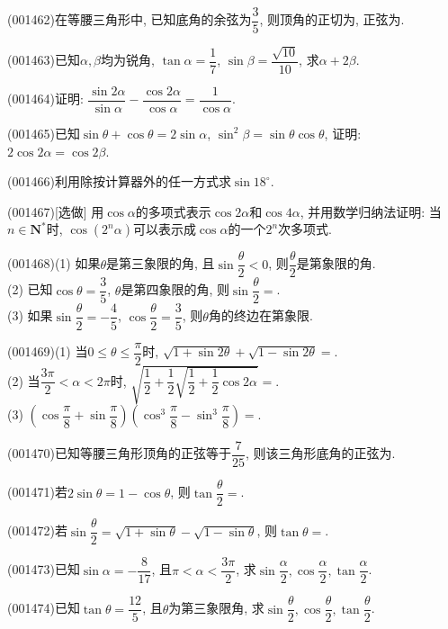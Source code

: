 \item (001462)在等腰三角形中, 已知底角的余弦为$\dfrac{3}{5}$, 则顶角的正切为, 正弦为.
\item (001463)已知$\alpha,\beta$均为锐角, $\tan\alpha=\dfrac{1}{7}$, $\sin\beta=\dfrac{\sqrt{10}}{10}$, 求$\alpha+2\beta$.
\item (001464)证明: $\dfrac{\sin 2\alpha}{\sin \alpha}-\dfrac{\cos 2\alpha}{\cos \alpha}=\dfrac{1}{\cos \alpha}$.
\item (001465)已知$\sin \theta+\cos\theta=2\sin \alpha$, $\sin^2\beta=\sin \theta\cos\theta$, 证明: $2\cos 2\alpha=\cos 2\beta$.
\item (001466)利用除按计算器外的任一方式求$\sin 18^\circ$.
\item (001467)[选做]
用$\cos\alpha$的多项式表示$\cos 2\alpha$和$\cos 4\alpha$, 并用数学归纳法证明: 当$n \in \mathbf{N}^*$时, $\cos(2^n \alpha)$可以表示成$\cos \alpha$的一个$2^n$次多项式.
\item (001468)(1) 如果$\theta$是第三象限的角, 且$\sin \dfrac{\theta}{2}<0$, 则$\dfrac{\theta}{2}$是第象限的角.\\ 
(2) 已知$\cos\theta=\dfrac{3}{5}$, $\theta$是第四象限的角, 则$\sin \dfrac{\theta}{2}=$.\\ 
(3) 如果$\sin \dfrac{\theta}{2}=-\dfrac{4}{5}$, $\cos\dfrac{\theta}{2}=\dfrac{3}{5}$, 则$\theta$角的终边在第象限.
\item (001469)(1) 当$0\le \theta\le \dfrac{\pi}{2}$时, $\sqrt{1+\sin 2\theta}+\sqrt{1-\sin 2\theta}=$.\\ 
(2) 当$\dfrac{3\pi}{2}<\alpha<2\pi$时, $\sqrt{\dfrac{1}{2}+\dfrac{1}{2}\sqrt{\dfrac{1}{2}+\dfrac{1}{2}\cos 2\alpha}}=$.\\ 
(3) $\left(\cos \dfrac{\pi}{8}+\sin \dfrac{\pi}{8}\right)\left(\cos^3\dfrac{\pi}{8}-\sin^3\dfrac{\pi}{8}\right)=$.
\item (001470)已知等腰三角形顶角的正弦等于$\dfrac{7}{25}$, 则该三角形底角的正弦为.
\item (001471)若$2\sin\theta=1-\cos\theta$, 则$\tan \dfrac{\theta}{2}=$.
\item (001472)若$\sin \dfrac{\theta}{2}=\sqrt{1+\sin\theta}-\sqrt{1-\sin\theta}$, 则$\tan\theta=$.
\item (001473)已知$\sin\alpha=-\dfrac{8}{17}$, 且$\pi<\alpha<\dfrac{3\pi}{2}$, 求$\sin\dfrac{\alpha}{2}, \cos\dfrac{\alpha}{2}, \tan\dfrac{\alpha}{2}$.
\item (001474)已知$\tan\theta=\dfrac{12}{5}$, 且$\theta$为第三象限角, 求$\sin\dfrac{\theta}{2}, \cos\dfrac{\theta}{2}, \tan\dfrac{\theta}{2}$.
